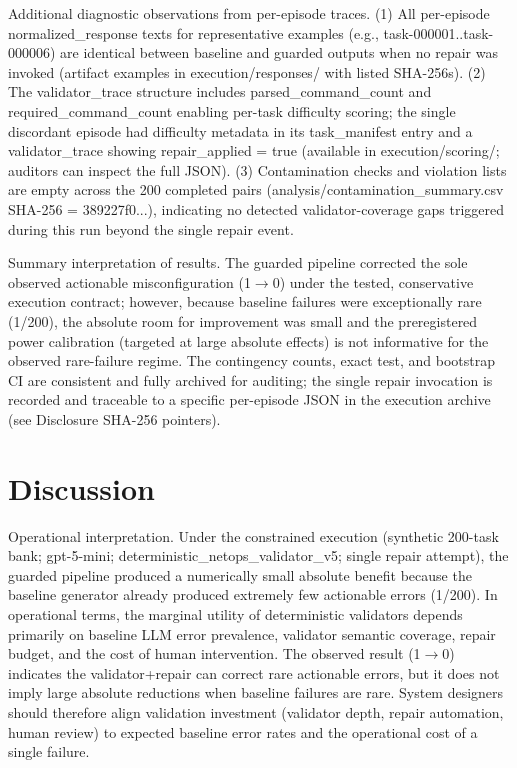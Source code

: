 \documentclass[conference]{IEEEtran}
\begin{document}
Additional diagnostic observations from per-episode traces. (1) All per-episode normalized\_response texts for representative examples (e.g., task-000001..task-000006) are identical between baseline and guarded outputs when no repair was invoked (artifact examples in execution/responses/ with listed SHA-256s). (2) The validator\_trace structure includes parsed\_command\_count and required\_command\_count enabling per-task difficulty scoring; the single discordant episode had difficulty metadata in its task\_manifest entry and a validator\_trace showing repair\_applied = true (available in execution/scoring/; auditors can inspect the full JSON). (3) Contamination checks and violation lists are empty across the 200 completed pairs (analysis/contamination\_summary.csv SHA-256 = 389227f0...), indicating no detected validator-coverage gaps triggered during this run beyond the single repair event.

Summary interpretation of results. The guarded pipeline corrected the sole observed actionable misconfiguration (1\ensuremath{\rightarrow}0) under the tested, conservative execution contract; however, because baseline failures were exceptionally rare (1/200), the absolute room for improvement was small and the preregistered power calibration (targeted at large absolute effects) is not informative for the observed rare-failure regime. The contingency counts, exact test, and bootstrap CI are consistent and fully archived for auditing; the single repair invocation is recorded and traceable to a specific per-episode JSON in the execution archive (see Disclosure SHA-256 pointers).

\section{Discussion}
Operational interpretation. Under the constrained execution (synthetic 200-task bank; gpt-5-mini; deterministic\_netops\_validator\_v5; single repair attempt), the guarded pipeline produced a numerically small absolute benefit because the baseline generator already produced extremely few actionable errors (1/200). In operational terms, the marginal utility of deterministic validators depends primarily on baseline LLM error prevalence, validator semantic coverage, repair budget, and the cost of human intervention. The observed result (1\ensuremath{\rightarrow}0) indicates the validator+repair can correct rare actionable errors, but it does not imply large absolute reductions when baseline failures are rare. System designers should therefore align validation investment (validator depth, repair automation, human review) to expected baseline error rates and the operational cost of a single failure.
\end{document}

